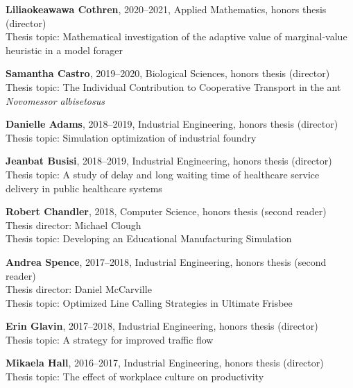 \documentclass[10pt]{article}           %
\begin{document}
\begin{cvlist}[loose]
    \item \textbf{Liliaokeawawa Cothren}, 2020--2021, Applied Mathematics, honors thesis (director)\\
        Thesis topic: Mathematical investigation of the adaptive value of marginal-value heuristic in a model forager

    \item \textbf{Samantha Castro}, 2019--2020, Biological Sciences, honors thesis (director)\\
        Thesis topic: The Individual Contribution to Cooperative Transport in the ant \emph{Novomessor albisetosus}

    \item \textbf{Danielle Adams}, 2018--2019, Industrial Engineering, honors thesis (director)\\
        Thesis topic: Simulation optimization of industrial foundry

    \item \textbf{Jeanbat Busisi}, 2018--2019, Industrial Engineering, honors thesis (director)\\
        Thesis topic: A study of delay and long waiting time of healthcare service delivery in public healthcare systems

    \item \textbf{Robert Chandler}, 2018, Computer Science, honors thesis (second reader)
        Thesis director: Michael Clough\\
        Thesis topic: Developing an Educational Manufacturing Simulation

    \item \textbf{Andrea Spence}, 2017--2018, Industrial Engineering, honors thesis (second reader)\\
        Thesis director: Daniel McCarville\\
        Thesis topic: Optimized Line Calling Strategies in Ultimate Frisbee

    \item \textbf{Erin Glavin}, 2017--2018, Industrial Engineering, honors thesis (director)\\
        Thesis topic: A strategy for improved traffic flow

    \item \textbf{Mikaela Hall}, 2016--2017, Industrial Engineering, honors thesis (director)\\
        Thesis topic: The effect of workplace culture on productivity


\end{cvlist}
\end{document}
